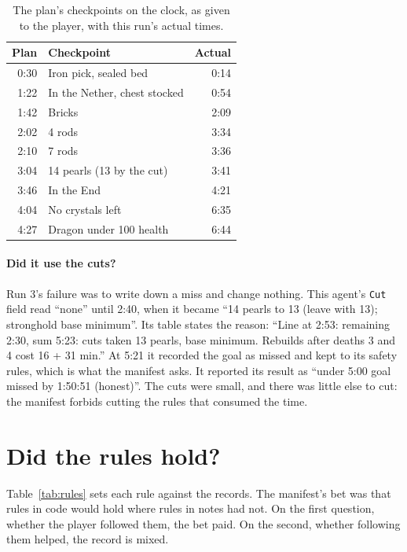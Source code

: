 \documentclass[11pt,a4paper]{article}
\begin{document}
\begin{table}[t]
  \caption{The plan's checkpoints on the clock, as given to the player, with this run's actual times.}
  \label{tab:checkpoints}
  \small
  \begin{tabularx}{\textwidth}{@{}rXr@{}}
    \toprule
    \textbf{Plan} & \textbf{Checkpoint} & \textbf{Actual} \\
    \midrule
    0:30 & Iron pick, sealed bed & 0:14 \\
    1:22 & In the Nether, chest stocked & 0:54 \\
    1:42 & Bricks & 2:09 \\
    2:02 & 4 rods & 3:34 \\
    2:10 & 7 rods & 3:36 \\
    3:04 & 14 pearls (13 by the cut) & 3:41 \\
    3:46 & In the End & 4:21 \\
    4:04 & No crystals left & 6:35 \\
    4:27 & Dragon under 100 health & 6:44 \\
    \bottomrule
  \end{tabularx}
\end{table}

\paragraph{Did it use the cuts?} Run 3's failure was to write down a miss and change nothing. This agent's \texttt{Cut} field read ``none'' until 2:40, when it became ``14 pearls to 13 (leave with 13); stronghold base minimum''. Its table states the reason: ``Line at 2:53: remaining 2:30, sum 5:23: cuts taken 13 pearls, base minimum. Rebuilds after deaths 3 and 4 cost 16 + 31 min.'' At 5:21 it recorded the goal as missed and kept to its safety rules, which is what the manifest asks. It reported its result as ``under 5:00 goal missed by 1:50:51 (honest)''. The cuts were small, and there was little else to cut: the manifest forbids cutting the rules that consumed the time.

\section{Did the rules hold?}
\label{sec:rules}

Table~\ref{tab:rules} sets each rule against the records. The manifest's bet was that rules in code would hold where rules in notes had not. On the first question, whether the player followed them, the bet paid. On the second, whether following them helped, the record is mixed.
\end{document}
